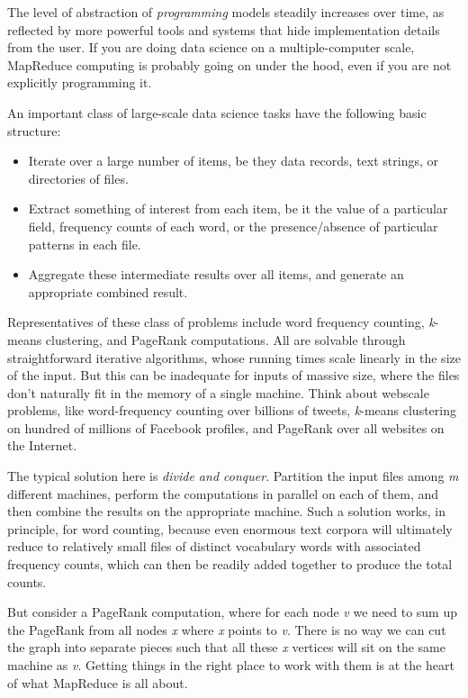 \documentclass[10pt]{article}
\begin{document}
\begin{enumerate}
The level of abstraction of \textit{programming} models steadily increases over time, as reflected by more powerful tools and systems that hide implementation details from the user. If you are doing data science on a multiple-computer scale, MapReduce computing is probably going on under the hood, even if you are not explicitly programming it.

An important class of large-scale data science tasks have the following basic structure:

\begin{itemize}
  \item Iterate over a large number of items, be they data records, text strings, or directories of files.
  \item Extract something of interest from each item, be it the value of a particular field, frequency counts of each word, or the presence/absence of particular patterns in each file.
  \item Aggregate these intermediate results over all items, and generate an appropriate combined result.
\end{itemize}

Representatives of these class of problems include word frequency counting, \textit{k}-means clustering, and PageRank computations. All are solvable through straightforward iterative algorithms, whose running times scale linearly in the size of the input. But this can be inadequate for inputs of massive size, where the files don't naturally fit in the memory of a single machine. Think about webscale problems, like word-frequency counting over billions of tweets, \textit{k}-means clustering on hundred of millions of Facebook profiles, and PageRank over all websites on the Internet.

The typical solution here is \textit{divide and conquer}. Partition the input files among \textit{m} different machines, perform the computations in parallel on each of them, and then combine the results on the appropriate machine. Such a solution works, in principle, for word counting, because even enormous text corpora will ultimately reduce to relatively small files of distinct vocabulary words with associated frequency counts, which can then be readily added together to produce the total counts.

But consider a PageRank computation, where for each node \textit{v} we need to sum up the PageRank from all nodes \textit{x} where \textit{x} points to \textit{v}. There is no way we can cut the graph into separate pieces such that all these \textit{x} vertices will sit on the same machine as \textit{v}. Getting things in the right place to work with them is at the heart of what MapReduce is all about.


\end{enumerate}
\end{document}
